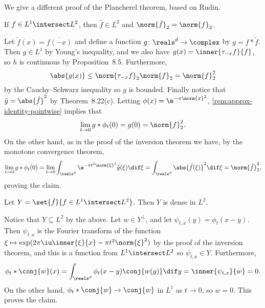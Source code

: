 \documentclass[article, a4paper, 11pt, oneside]{memoir}
\numberwithin{equation}{chapter}
\newenvironment{displaytheorem}{%
	\begin{displayquote}\itshape%
}{%
	\end{displayquote}%
}
\theoremstyle{nonumberplain}
\begin{document}
\begin{remarkbreak}
	We give a different proof of the Plancherel theorem, based on Rudin.
	\begin{displaytheorem}
		If $f \in L^1 \intersect L^2$, then $\hat{f} \in L^2$ and $\norm{\hat{f}}_2 = \norm{f}_2$.
	\end{displaytheorem}
	Let $\tilde{f}(x) = \overline{f(-x)}$ and define a function $g \colon \reals^d \to \complex$ by $g = f * \tilde{f}$. Then $g \in L^1$ by Young's inequality, and we also have $g(x) = \inner{\tau_{-x}f}{f}$, so $h$ is continuous by Proposition~8.5. Furthermore,
	\begin{equation*}
		\abs{g(x)}
			\leq \norm{\tau_{-x}f}_2 \norm{f}_2
			= \norm{f}_2^2
	\end{equation*}
	by the Cauchy--Schwarz inequality so $g$ is bounded. Finally notice that $\hat{g} = \abs{\hat{f}}^2$ by Theorem~8.22(c). Letting $\phi(x) = \e^{-\pi\norm{x}^2}$, \cref{rem:approx-identity-pointwise} implies that
	\begin{equation*}
		\lim_{t \to 0} g * \phi_t(0)
			= g(0)
			= \norm{f}_2^2.
	\end{equation*}
	On the other hand, as in the proof of the inversion theorem we have, by the monotone convergence theorem,
	\begin{equation*}
		\lim_{t \to 0} g * \phi_t(0)
			= \lim_{t \to 0} \int_{\reals^d} \e^{-\pi t^2 \norm{\xi}^2} \hat{g}(\xi) \dif \xi
			= \int_{\reals^d} \abs{\hat{f}(\xi)}^2 \dif \xi
			= \norm{\hat{f}}_2^2,
	\end{equation*}
	proving the claim.

	\begin{displaytheorem}
		Let $Y = \set{\hat{f}}{f \in L^1 \intersect L^2}$. Then $Y$ is dense in $L^2$.
	\end{displaytheorem}
	Notice that $Y \subseteq L^2$ by the above. Let $w \in Y^\perp$, and let $\psi_{t,x}(y) = \phi_t(x-y)$. Then $\psi_{t,x}$ is the Fourier transform of the function $\xi \mapsto \exp(2\pi \iu \inner{\xi}{x} - \pi t^2 \norm{\xi}^2)$ by the proof of the inversion theorem, and this is a function from $L^1 \intersect L^2$ so $\psi_{t,x} \in Y$. Furthermore,
	\begin{equation*}
		\phi_t * \conj{w}(x)
			= \int_{\reals^d} \phi_t(x-y) \conj{w(y)} \dif y
			= \inner{\psi_{t,x}}{w}
			= 0.
	\end{equation*}
	On the other hand, $\phi_t * \conj{w} \to \conj{w}$ in $L^1$ as $t \to 0$, so $w = 0$. This proves the claim.
\end{remarkbreak}
\end{document}
